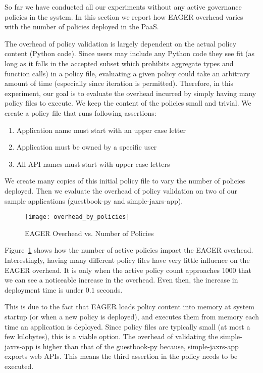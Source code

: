 So far we have conducted all our experiments without any active governance policies in the system. In this section we report how EAGER overhead
varies with the number of policies deployed in the PaaS. 

The overhead of policy validation is largely dependent on the actual policy
content (Python code). Since users may include any Python code they see fit
(as long as it falls in the accepted subset which prohibits aggregate
types and function calls) in a policy file, evaluating a
given policy could take an arbitrary amount of time (especially since
iteration is permitted). Therefore, in this
experiment, our goal is to evaluate the overhead incurred by simply having
many policy files to execute. We keep the content of the policies small and
trivial. We create a policy file that runs following assertions:
\begin{enumerate} 
\item Application name must start with an upper case letter
\item Application must be owned by a specific user 
\item All API names must start with upper case letters 
\end{enumerate} We create many copies of this
initial policy file to vary the number of policies deployed. Then we evaluate
the overhead of policy validation on two of our sample applications
(guestbook-py and simple-jaxrs-app). 

\begin{figure}
\centering
\texttt{[image: overhead\_by\_policies]}
\vspace{-0.01in}
\caption{EAGER Overhead vs. Number of Policies}
\label{fig:overhead_by_policies}
\end{figure}

Figure~\ref{fig:overhead_by_policies} shows how the number of active policies
impact the EAGER overhead. Interestingly, having many different policy files
have very little influence on the EAGER overhead. It is only when the active
policy count approaches $1000$ that we can see a noticeable increase in the
overhead. Even then, the increase in deployment time is under $0.1$ seconds. 

This is due to the fact that EAGER loads policy content into memory at system
startup (or when a new policy is deployed), and executes them from memory each
time an application is deployed. Since policy files are typically small (at
most a few kilobytes), this is a viable option. The overhead of validating the
simple-jaxrs-app is higher than that of the guestbook-py because,
simple-jaxrs-app exports web APIs. This means the third assertion in the
policy needs to be executed. 

